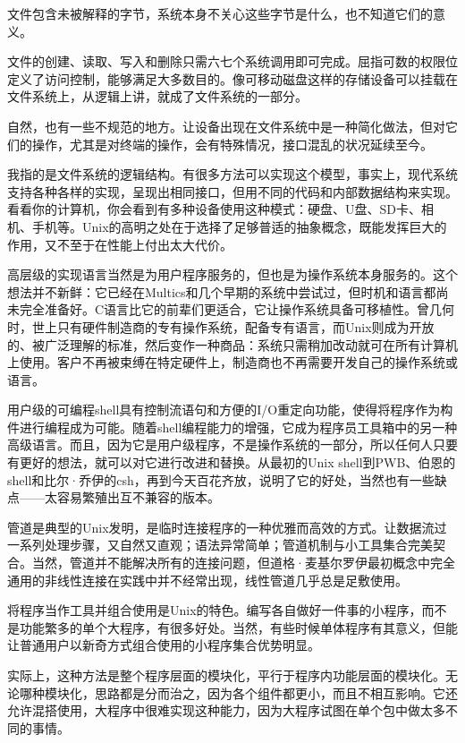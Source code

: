 \documentclass[a4paper,12pt,UTF8,twoside]{ctexbook}
\begin{document}
文件包含未被解释的字节，系统本身不关心这些字节是什么，也不知道它们的意义。

文件的创建、读取、写入和删除只需六七个系统调用即可完成。屈指可数的权限位定义了访问控制，能够满足大多数目的。像可移动磁盘这样的存储设备可以挂载在文件系统上，从逻辑上讲，就成了文件系统的一部分。

自然，也有一些不规范的地方。让设备出现在文件系统中是一种简化做法，但对它们的操作，尤其是对终端的操作，会有特殊情况，接口混乱的状况延续至今。

我指的是文件系统的逻辑结构。有很多方法可以实现这个模型，事实上，现代系统支持各种各样的实现，呈现出相同接口，但用不同的代码和内部数据结构来实现。看看你的计算机，你会看到有多种设备使用这种模式：硬盘、U盘、SD卡、相机、手机等。Unix的高明之处在于选择了足够普适的抽象概念，既能发挥巨大的作用，又不至于在性能上付出太大代价。

高层级的实现语言当然是为用户程序服务的，但也是为操作系统本身服务的。这个想法并不新鲜：它已经在Multics和几个早期的系统中尝试过，但时机和语言都尚未完全准备好。C语言比它的前辈们更适合，它让操作系统具备可移植性。曾几何时，世上只有硬件制造商的专有操作系统，配备专有语言，而Unix则成为开放的、被广泛理解的标准，然后变作一种商品：系统只需稍加改动就可在所有计算机上使用。客户不再被束缚在特定硬件上，制造商也不再需要开发自己的操作系统或语言。

用户级的可编程shell具有控制流语句和方便的I/O重定向功能，使得将程序作为构件进行编程成为可能。随着shell编程能力的增强，它成为程序员工具箱中的另一种高级语言。而且，因为它是用户级程序，不是操作系统的一部分，所以任何人只要有更好的想法，就可以对它进行改进和替换。从最初的Unix shell到PWB、伯恩的shell和比尔·乔伊的csh，再到今天百花齐放，说明了它的好处，当然也有一些缺点——太容易繁殖出互不兼容的版本。

管道是典型的Unix发明，是临时连接程序的一种优雅而高效的方式。让数据流过一系列处理步骤，又自然又直观；语法异常简单；管道机制与小工具集合完美契合。当然，管道并不能解决所有的连接问题，但道格·麦基尔罗伊最初概念中完全通用的非线性连接在实践中并不经常出现，线性管道几乎总是足敷使用。

将程序当作工具并组合使用是Unix的特色。编写各自做好一件事的小程序，而不是功能繁多的单个大程序，有很多好处。当然，有些时候单体程序有其意义，但能让普通用户以新奇方式组合使用的小程序集合优势明显。

实际上，这种方法是整个程序层面的模块化，平行于程序内功能层面的模块化。无论哪种模块化，思路都是分而治之，因为各个组件都更小，而且不相互影响。它还允许混搭使用，大程序中很难实现这种能力，因为大程序试图在单个包中做太多不同的事情。
\end{document}
